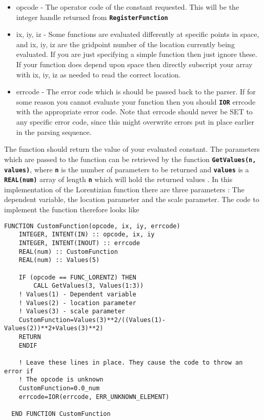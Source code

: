 \documentclass[12pt,a4paper]{article}
\newcommand{\simpleboxverbatim}{\begin{Verbatim}[obeytabs=true,frame=single,
  framerule=0.5mm,rulecolor=\color{warwickmid},formatcom=\color{black}]}
\newcommand{\inlinecode}[1]{{\color{warwickred} \bf\texttt{#1}}}
\begin{document}
\begin{itemize}
\item opcode - The operator code of the constant requested. This will be the
  integer handle returned from \inlinecode {RegisterFunction}
\item ix, iy, iz - Some functions are evaluated differently at specific points
  in space, and ix, iy, iz are the gridpoint number of the location currently
  being evaluated. If you are just specifying a simple function then just
  ignore these. If your function does depend upon space then directly
  subscript your array with ix, iy, iz as needed to read the correct location.
\item errcode - The error code which is should be passed back to the
  parser. If for some reason you cannot evaluate your function then you should
  \inlinecode{IOR} errcode with the appropriate error code. Note that errcode
  should never be SET to any specific error code, since this might overwrite
  errors put in place earlier in the parsing sequence.
\end{itemize}

The function should return the value of your evaluated constant. The
parameters which are passed to the function can be retrieved by the function
\inlinecode {GetValues(n, values)}, where \inlinecode {n} is the number of
parameters to be returned and \inlinecode{values} is a \inlinecode{REAL(num)}
array of length \inlinecode{n} which will hold the returned values .  In this
implementation of the Lorentizian function there are three parameters : The
dependent variable, the location parameter and the scale parameter. The code
to implement the function therefore looks like

\simpleboxverbatim
  FUNCTION CustomFunction(opcode, ix, iy, errcode)
    INTEGER, INTENT(IN) :: opcode, ix, iy
    INTEGER, INTENT(INOUT) :: errcode
    REAL(num) :: CustomFunction
    REAL(num) :: Values(5)

    IF (opcode == FUNC_LORENTZ) THEN
    	CALL GetValues(3, Values(1:3))
	! Values(1) - Dependent variable
	! Values(2) - location parameter
	! Values(3) - scale parameter
	CustomFunction=Values(3)**2/((Values(1)-Values(2))**2+Values(3)**2)
	RETURN
    ENDIF

    ! Leave these lines in place. They cause the code to throw an error if
    ! The opcode is unknown
    CustomFunction=0.0_num
    errcode=IOR(errcode, ERR_UNKNOWN_ELEMENT)

  END FUNCTION CustomFunction
\end{Verbatim}
\end{document}
